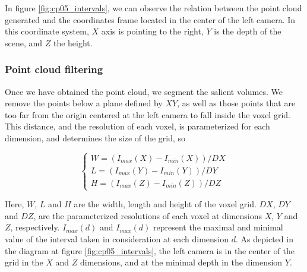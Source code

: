 In figure \ref{fig:cp05_intervals}, we can observe the relation between the point cloud generated and the coordinates frame located in the center of the left camera. In this coordinate system, $X$ axis is pointing to the right, $Y$ is the depth of the scene, and $Z$ the height.


\subsubsection{Point cloud filtering}\label{ch:chapter05_01_01_01}

Once we have obtained the point cloud, we segment the salient volumes. We remove the points below a plane defined by $XY$, as well as those points that are too far from the origin centered at the left camera to fall inside the voxel grid. This distance, and the resolution of each voxel, is parameterized for each dimension, and determines the size of the grid, so

\begin{equation}\label{eq:cp05_filter_limits}
\begin{cases}
W = (I_{max}(X) - I_{min}(X)) / {DX} \\
L = (I_{max}(Y) - I_{min}(Y)) / {DY} \\
H = (I_{max}(Z) - I_{min}(Z)) / {DZ}
\end{cases}
\end{equation}

Here, $W$, $L$ and $H$ are the width, length and height of the voxel grid. $DX$, $DY$ and $DZ$, are the parameterized resolutions of each voxel at dimensions $X$, $Y$ and $Z$, respectively. $I_{max}(d)$ and $I_{max}(d)$ represent the maximal and minimal value of the interval taken in consideration at each dimension $d$. As depicted in the diagram at figure \ref{fig:cp05_intervals}, the left camera is in the center of the grid in the $X$ and $Z$ dimensions, and at the minimal depth in the dimension $Y$.

